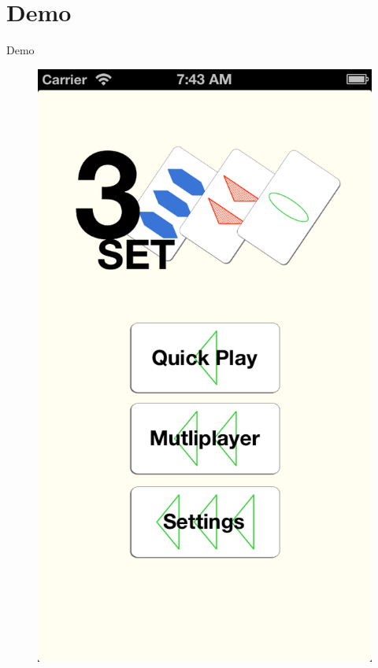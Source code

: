 \documentclass{beamer}
\begin{document}
\section{Demo}
\begin{frame}{Demo}
 
\begin{figure}
 \centering
 \includegraphics[width=.3\paperwidth]{img/landing.png}
\end{figure}
\end{frame}
\end{document}

